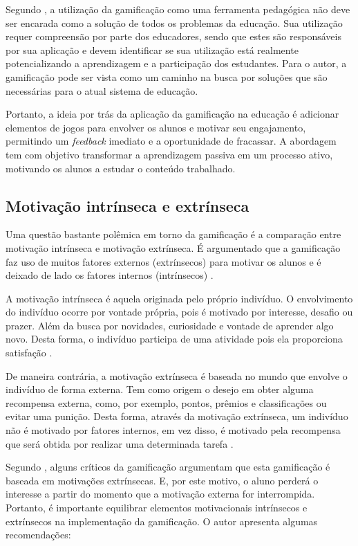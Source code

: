 \documentclass[
	12pt,				%
	oneside,			%
	a4paper,			%
	english,			%
	french,				%
	spanish,			%
	brazil,				%
	]{abntex2}
\begin{document}
Segundo \citet{fardo2013gamificaccao}, a utilização da gamificação como uma ferramenta pedagógica não deve ser encarada como a solução de todos os problemas da educação. Sua utilização requer compreensão por parte dos educadores, sendo que estes são responsáveis por sua aplicação e devem identificar se sua utilização está realmente potencializando a aprendizagem e a participação dos estudantes. Para o autor, a gamificação pode ser vista como um caminho na busca por soluções que são necessárias para o atual sistema de educação.

Portanto, a ideia por trás da aplicação da gamificação na educação é adicionar elementos de jogos para envolver os alunos e motivar seu engajamento, permitindo um \textit{feedback} imediato e a oportunidade de fracassar. A abordagem tem com objetivo transformar a aprendizagem passiva em um processo ativo, motivando os alunos a estudar o conteúdo trabalhado.

\subsection{Motivação intrínseca e extrínseca}

Uma questão bastante polêmica em torno da gamificação é a comparação entre motivação intrínseca e motivação extrínseca. É argumentado que a gamificação faz uso de muitos fatores externos (extrínsecos) para motivar os alunos e é deixado de lado os fatores internos (intrínsecos) \cite{fardo2013gamificaccao}.

A motivação intrínseca é aquela originada pelo próprio indivíduo. O envolvimento do indivíduo ocorre por vontade própria,  pois é motivado por interesse, desafio ou prazer. Além da busca por novidades, curiosidade e vontade de aprender algo novo. Desta forma, o indivíduo participa de uma atividade pois ela proporciona satisfação \cite{busarello2016gamificaccao}.

De maneira contrária, a motivação extrínseca é baseada no mundo que envolve o indivíduo de forma externa. Tem como origem o desejo em obter alguma recompensa externa, como, por exemplo, pontos, prêmios e classificações ou evitar uma punição. Desta forma, através da motivação extrínseca, um indivíduo não é motivado por fatores internos, em vez disso, é motivado pela recompensa que será obtida por realizar uma determinada tarefa \cite{busarello2016gamificaccao}.

Segundo \citet{andre2018}, alguns críticos da gamificação argumentam que esta gamificação é baseada em motivações extrínsecas. E, por este motivo, o aluno perderá o interesse a partir do momento que a motivação externa for interrompida. Portanto, é importante equilibrar elementos motivacionais intrínsecos e extrínsecos na implementação da gamificação. O autor apresenta algumas recomendações:
\end{document}
